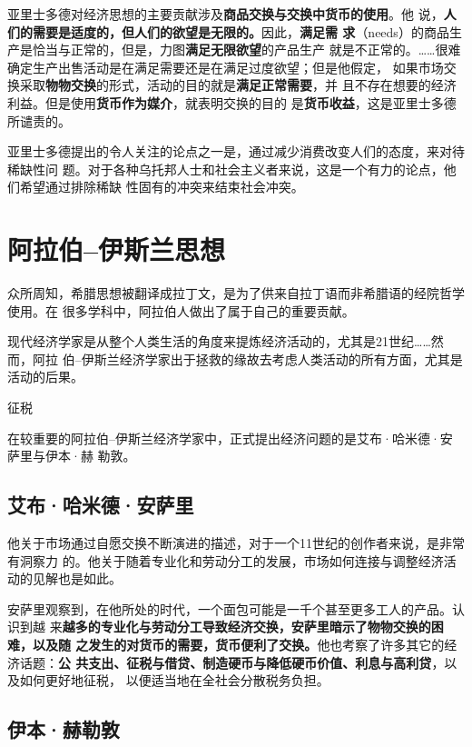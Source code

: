 亚里士多德对经济思想的主要贡献涉及\textbf{商品交换与交换中货币的使用}。他
说，\textbf{人们的需要是适度的，但人们的欲望是无限的。}因此，\textbf{满足需
  求}（needs）的商品生产是恰当与正常的，但是，力图\textbf{满足无限欲望}的产品生产
就是不正常的。……很难确定生产出售活动是在满足需要还是在满足过度欲望；但是他假定，
如果市场交换采取\textbf{物物交换}的形式，活动的目的就是\textbf{满足正常需要}，并
且不存在想要的经济利益。但是使用\textbf{货币作为媒介}，就表明交换的目的
是\textbf{货币收益}，这是亚里士多德所谴责的。

亚里士多德提出的令人关注的论点之一是，通过减少消费改变人们的态度，来对待稀缺性问
题。对于各种乌托邦人士和社会主义者来说，这是一个有力的论点，他们希望通过排除稀缺
性固有的冲突来结束社会冲突。

\section{阿拉伯--伊斯兰思想}

众所周知，希腊思想被翻译成拉丁文，是为了供来自拉丁语而非希腊语的经院哲学使用。在
很多学科中，阿拉伯人做出了属于自己的重要贡献。

现代经济学家是从整个人类生活的角度来提炼经济活动的，尤其是21世纪……然而，阿拉
伯--伊斯兰经济学家出于拯救的缘故去考虑人类活动的所有方面，尤其是活动的后果。

征税

在较重要的阿拉伯--伊斯兰经济学家中，正式提出经济问题的是艾布·哈米德·安萨里与伊本·赫
勒敦。

\subsection{艾布·哈米德·安萨里}

他关于市场通过自愿交换不断演进的描述，对于一个11世纪的创作者来说，是非常有洞察力
的。他关于随着专业化和劳动分工的发展，市场如何连接与调整经济活动的见解也是如此。

安萨里观察到，在他所处的时代，一个面包可能是一千个甚至更多工人的产品。认识到越
来\textbf{越多的专业化与劳动分工导致经济交换，安萨里暗示了物物交换的困难，以及随
  之发生的对货币的需要，货币便利了交换。}他也考察了许多其它的经济话题：\textbf{公
  共支出、征税与借贷、制造硬币与降低硬币价值、利息与高利贷}，以及如何更好地征税，
以便适当地在全社会分散税务负担。

\subsection{伊本·赫勒敦}

